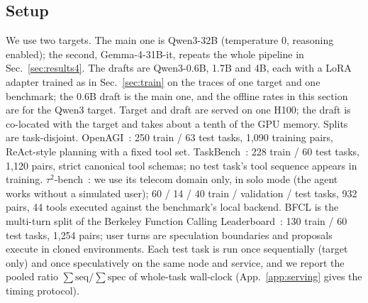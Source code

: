 \subsection{Setup}
\label{app:detail:setup}
We use two targets. The main one is Qwen3-32B (temperature 0, reasoning enabled); the second,
Gemma-4-31B-it, repeats the whole pipeline in Sec.~\ref{sec:results4}. The drafts are
Qwen3-0.6B, 1.7B and 4B, each with a LoRA adapter trained as in Sec.~\ref{sec:train} on the traces of
one target and one benchmark; the 0.6B draft is the main one, and the offline rates in this section are
for the Qwen3 target. Target and draft are served on one H100; the draft is co-located with the target
and takes about a tenth of the GPU memory. Splits are task-disjoint.
OpenAGI~\citep{openagi}: 250 train / 63 test tasks, 1{,}090 training pairs, ReAct-style planning with a
fixed tool set. TaskBench~\citep{taskbench}: 228 train / 60 test tasks, 1{,}120 pairs, strict canonical
tool schemas; no test task's tool sequence appears in training. $\tau^2$-bench~\citep{tau2bench}: we use its telecom domain only, in solo mode (the agent works without a
simulated user); 60 / 14 / 40 train / validation / test tasks, 932 pairs, 44 tools executed against the
benchmark's local backend. BFCL is the multi-turn split of the Berkeley Function
Calling Leaderboard~\citep{bfcl}: 130 train / 60 test tasks, 1{,}254 pairs; user
turns are speculation boundaries and proposals execute in cloned environments. Each test task is run once
sequentially (target only) and once speculatively on the same node and service, and we report the pooled
ratio $\sum \text{seq} / \sum \text{spec}$ of whole-task wall-clock (App.~\ref{app:serving} gives the timing protocol).

